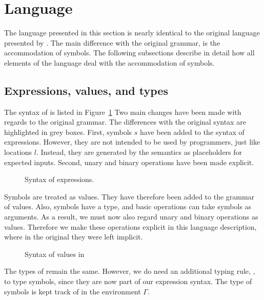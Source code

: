 
\section{Language}
\label{sec:language}

The language presented in this section is nearly identical to the original \TOPHAT language presented by \citet{Steenvoorden2019}.
The main difference with the original grammar, is the accommodation of symbols.
The following subsections describe in detail how all elements of the \TOPHAT language deal with the accommodation of symbols.



\subsection{Expressions, values, and types}
\label{expressions}

The syntax of \TOPHAT is listed in Figure~\ref{fig:syntaxtophat}
Two main changes have been made with regards to the original \TOPHAT grammar.
The differences with the original syntax are highlighted in grey boxes.
First, symbols $s$ have been added to the syntax of expressions.
However, they are not intended to be used by programmers, just like locations $l$.
Instead, they are generated by the semantics as placeholders for expected inputs.
Second, unary and binary operations have been made explicit.

\begin{figure}[h]
  \small
  \caption{Syntax of \TOPHAT expressions.}
  \label{fig:syntaxtophat}
\end{figure}

Symbols are treated as values.
They have therefore been added to the grammar of values.
Also, symbols have a type, and basic operations can take symbols as arguments.
As a result, we must now also regard unary and binary operations as values.
Therefore we make these operations explicit in this language description,
where in the original they were left implicit.

\begin{figure}[h]
  \small
  \caption{Syntax of values in \TOPHAT}
  \label{fig:syntaxvalues}
\end{figure}

The types of \TOPHAT remain the same.
However, we do need an additional typing rule, , to type symbols,
since they are now part of our expression syntax.
The type of symbols is kept track of in the environment $\Gamma$.

